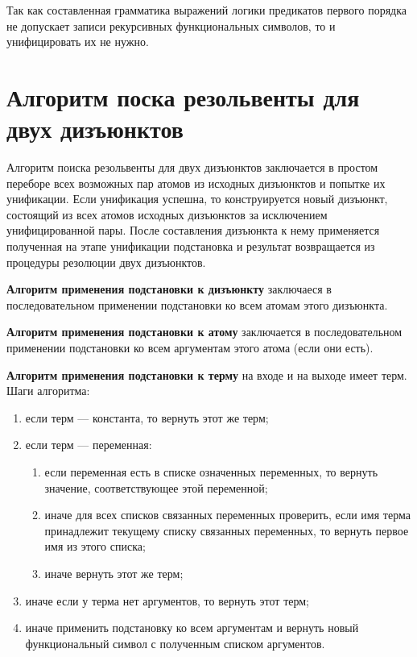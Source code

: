 Так как составленная грамматика выражений логики предикатов первого порядка не допускает записи рекурсивных функциональных символов, то и унифицировать их не нужно.

\section{Алгоритм поска резольвенты для двух дизъюнктов}

Алгоритм поиска резольвенты для двух дизъюнктов заключается в простом переборе всех возможных пар атомов из исходных дизъюнктов и попытке их унификации. Если унификация успешна, то конструируется новый дизъюнкт, состоящий из всех атомов исходных дизъюнктов за исключением унифицированной пары. После составления дизъюнкта к нему применяется полученная на этапе унификации подстановка и результат возвращается из процедуры резолюции двух дизъюнктов.

\textbf{Алгоритм применения подстановки к дизъюнкту} заключаеся в последовательном применении подстановки ко всем атомам этого дизъюнкта.

\textbf{Алгоритм применения подстановки к атому} заключается в последовательном применении подстановки ко всем аргументам этого атома (если они есть).

\textbf{Алгоритм применения подстановки к терму} на входе и на выходе имеет терм. Шаги алгоритма:

\begin{enumerate}
    \item если терм --- константа, то вернуть этот же терм;
    \item если терм --- переменная:
    \begin{enumerate}
        \item если переменная есть в списке означенных переменных, то вернуть значение, соответствующее этой переменной;
        \item иначе для всех списков связанных переменных проверить, если имя терма принадлежит текущему списку связанных переменных, то вернуть первое имя из этого списка;
        \item иначе вернуть этот же терм;
    \end{enumerate}
    \item иначе если у терма нет аргументов, то вернуть этот терм;
    \item иначе применить подстановку ко всем аргументам и вернуть новый функциональный символ с полученным списком аргументов.
\end{enumerate}

